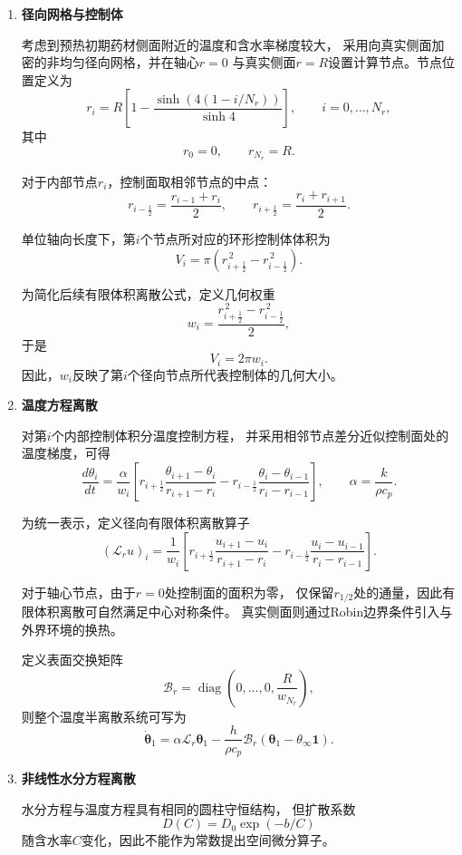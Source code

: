 \documentclass[withoutpreface]{cumcmthesis}
\begin{document}
\begin{enumerate}[label=(\arabic*)]

\item {\textbf{径向网格与控制体}}

考虑到预热初期药材侧面附近的温度和含水率梯度较大，
采用向真实侧面加密的非均匀径向网格，并在轴心$r=0$
与真实侧面$r=R$设置计算节点。节点位置定义为
\[
r_i
=
R\left[
1-
\frac{\sinh\!\left(4(1-i/N_r)\right)}{\sinh 4}
\right],
\qquad
i=0,\ldots,N_r,
\]
其中
\[
r_0=0,
\qquad
r_{N_r}=R.
\]

对于内部节点$r_i$，控制面取相邻节点的中点：
\[
r_{i-\frac12}
=
\frac{r_{i-1}+r_i}{2},
\qquad
r_{i+\frac12}
=
\frac{r_i+r_{i+1}}{2}.
\]

单位轴向长度下，第$i$个节点所对应的环形控制体体积为
\[
V_i
=
\pi
\left(
r_{i+\frac12}^{\,2}
-
r_{i-\frac12}^{\,2}
\right).
\]

为简化后续有限体积离散公式，定义几何权重
\[
w_i
=
\frac{
r_{i+\frac12}^{\,2}
-
r_{i-\frac12}^{\,2}
}{2},
\]
于是
\[
V_i=2\pi w_i.
\]
因此，$w_i$反映了第$i$个径向节点所代表控制体的几何大小。


\item {\textbf{温度方程离散}}

对第$i$个内部控制体积分温度控制方程，
并采用相邻节点差分近似控制面处的温度梯度，可得
\[
\frac{d\theta_i}{dt}
=
\frac{\alpha}{w_i}
\left[
r_{i+\frac12}
\frac{\theta_{i+1}-\theta_i}
{r_{i+1}-r_i}
-
r_{i-\frac12}
\frac{\theta_i-\theta_{i-1}}
{r_i-r_{i-1}}
\right],
\qquad
\alpha=\frac{k}{\rho c_p}.
\]

为统一表示，定义径向有限体积离散算子
\[
(\mathcal L_r u)_i
=
\frac{1}{w_i}
\left[
r_{i+\frac12}
\frac{u_{i+1}-u_i}
{r_{i+1}-r_i}
-
r_{i-\frac12}
\frac{u_i-u_{i-1}}
{r_i-r_{i-1}}
\right].
\]

对于轴心节点，由于$r=0$处控制面的面积为零，
仅保留$r_{1/2}$处的通量，因此有限体积离散可自然满足中心对称条件。
真实侧面则通过Robin边界条件引入与外界环境的换热。

定义表面交换矩阵
\[
\mathcal B_r
=
\operatorname{diag}
\left(
0,\ldots,0,
\frac{R}{w_{N_r}}
\right),
\]
则整个温度半离散系统可写为
\[
\dot{\boldsymbol\theta}_1
=
\alpha\mathcal L_r\boldsymbol\theta_1
-
\frac{h}{\rho c_p}
\mathcal B_r
\left(
\boldsymbol\theta_1
-
\theta_\infty\boldsymbol 1
\right).
\]


\item {\textbf{非线性水分方程离散}}

水分方程与温度方程具有相同的圆柱守恒结构，
但扩散系数
\[
D(C)=D_0\exp(-b/C)
\]
随含水率$C$变化，因此不能作为常数提出空间微分算子。


\end{enumerate}
\end{document}

